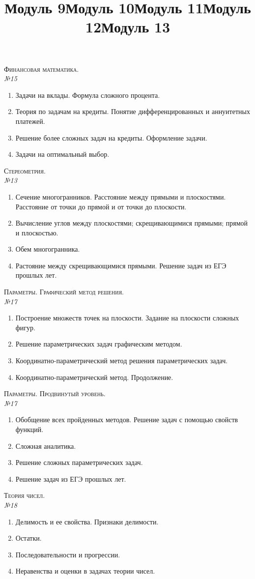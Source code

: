 \documentclass[12pt, a4paper]{article}
\begin{document}
\newpage
\title{Модуль 9}
\textsc{Финансовая математика.}\\[0.5em]
\textit{№15}
\begin{enumerate}[label=\textbf{\arabic*})]
	\item Задачи на вклады. Формула сложного процента.
	\item Теория по задачам на кредиты. Понятие дифференцированных и аннуитетных платежей.
	\item Решение более сложных задач на кредиты. Оформление задачи.
	\item Задачи на оптимальный выбор.
\end{enumerate}
\title{Модуль 10}
\textsc{Стереометрия.}\\[0.5em]
\textit{№13}
\begin{enumerate}[label=\textbf{\arabic*})]
	\item Сечение многогранников. Расстояние между прямыми и плоскостями. Расстояние от точки до прямой и от точки до плоскости.
	\item Вычисление углов между плоскостями; скрещивающимися прямыми; прямой и плоскостью.
	\item Обем многогранника.
	\item Растояние между скрещивающимися прямыми. Решение задач из ЕГЭ прошлых лет.
\end{enumerate}
\title{Модуль 11}
\textsc{Параметры. Графический метод решения.}\\[0.5em]
\textit{№17}
\begin{enumerate}[label=\textbf{\arabic*})]
	\item Построение множеств точек на плоскости. Задание на плоскости сложных фигур.
	\item Решение параметрических задач графическим методом.
	\item Координатно-параметрический метод решения параметрических задач.
	\item Координатно-параметрический метод. Продолжение.
\end{enumerate}
\title{Модуль 12}
\textsc{Параметры. Продвинутый уровень.}\\[0.5em]
\textit{№17}
\begin{enumerate}[label=\textbf{\arabic*})]
	\item Обобщение всех пройденных методов. Решение задач с помощью свойств функций.
	\item Сложная аналитика.
	\item Решение сложных параметрических задач.
	\item Решение задач из ЕГЭ прошлых лет.
\end{enumerate}
\newpage
\title{Модуль 13}
\textsc{Теория чисел.}\\[0.5em]
\textit{№18}
\begin{enumerate}[label=\textbf{\arabic*})]
	\item Делимость и ее свойства. Признаки делимости.
	\item Остатки.
	\item Последовательности и прогрессии.
	\item Неравенства и оценки в задачах теории чисел.
\end{enumerate}
\end{document}
